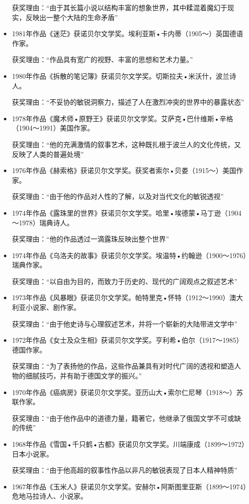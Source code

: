 \documentclass[UTF8,a4paper,8pt]{ctexart}
\begin{document}
\begin{itemize}
			获奖理由：“由于其长篇小说以结构丰富的想象世界，其中糅混着魔幻于现实，反映出一整个大陆的生命矛盾”
			\item 1981年作品《迷茫》获诺贝尔文学奖。埃利亚斯•卡内蒂（1905～）英国德语作家。
			
			获奖理由：“作品具有宽广的视野、丰富的思想和艺术力量。”
			\item 1980年作品《拆散的笔记簿》获诺贝尔文学奖。切斯拉夫•米沃什，波兰诗人。
			
			获奖理由：“不妥协的敏锐洞察力，描述了人在激烈冲突的世界中的暴露状态”
			\item 1978年作品《魔术师•原野王》获诺贝尔文学奖。艾萨克•巴什维斯•辛格（1904～1991）美国作家。
			
			获奖理由：“他的充满激情的叙事艺术，这种既扎根于波兰人的文化传统，又反映了人类的普遍处境”
			\item 1976年作品《赫索格》获诺贝尔文学奖。获奖者索尔•贝娄（1915～）美国作家。
			
			获奖理由：“由于他的作品对人性的了解，以及对当代文化的敏锐透视”
			\item 1974年作品《露珠里的世界》获诺贝尔文学奖。哈里•埃德蒙•马丁逊（1904～1978）瑞典诗人。
			
			获奖理由：“他的作品透过一滴露珠反映出整个世界”
			\item 1974年作品《乌洛夫的故事》获诺贝尔文学奖。埃温特•约翰逊（1900～1976）瑞典作家。
			
			获奖理由：“以自由为目的，而致力于历史的、现代的广阔观点之叙述艺术”
			\item 1973年作品《风暴眼》获诺贝尔文学奖。帕特里克•怀特（1912～1990）澳大利亚小说家、剧作家。
			
			获奖理由：“由于他史诗与心理叙述艺术，并将一个崭新的大陆带进文学中”
			\item 1972年作品《女士及众生相》获诺贝尔文学奖。亨利希•伯尔（1917～1985）德国作家。
			
			获奖理由：“为了表扬他的作品，这些作品兼具有对时代广阔的透视和塑造人物的细腻技巧，并有助于德国文学的振兴。”
			\item 1970年作品《癌病房》获诺贝尔文学奖。亚历山大•索尔仁尼琴（1918～）苏联作家。
			
			获奖理由：“由于他作品中的道德力量，籍著它，他继承了俄国文学不可或缺的传统”
			\item 1968年作品《雪国•千只鹤•古都》获诺贝尔文学奖。川端康成（1899～1972）日本小说家。
			
			获奖理由：“由于他高超的叙事性作品以非凡的敏锐表现了日本人精神特质”
			\item 1967年作品《玉米人》获诺贝尔文学奖。安赫尔•阿斯图里亚斯（1899～1974）危地马拉诗人、小说家。
			

\end{itemize}
\end{document}
